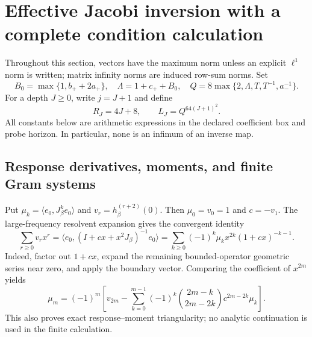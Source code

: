\section{Effective Jacobi inversion with a complete condition calculation}
\label{sec:quantitative-jacobi}
Throughout this section, vectors have the maximum norm unless an explicit
\(\ell^1\) norm is written; matrix infinity norms are induced row-sum norms.
Set
\[
 B_0=\max\{1,b_++2a_+\},\quad \Lambda=1+c_++B_0,\quad
 Q=8\max\{2,\Lambda,T,T^{-1},a_-^{-1}\}.
\]
For a depth \(J\ge0\), write \(j=J+1\) and define
\begin{equation}
 R_J=4J+8,\qquad L_J=Q^{64(J+1)^2}.
 \label{eq:effective-LJ}
\end{equation}
All constants below are arithmetic expressions in the declared coefficient
box and probe horizon. In particular, none is an infimum of an inverse map.

\subsection{Response derivatives, moments, and finite Gram systems}
Put \(\mu_k=\langle e_0,J_\beta^ke_0\rangle\) and
\(v_r=h_\beta^{(r+2)}(0)\). Then \(\mu_0=v_0=1\) and \(c=-v_1\).
The large-frequency resolvent expansion gives the convergent identity
\begin{equation}
 \sum_{r\ge0}v_rx^r
 =\langle e_0,(I+cx+x^2J_\beta)^{-1}e_0\rangle
 =\sum_{k\ge0}(-1)^k\mu_kx^{2k}(1+cx)^{-k-1}.
 \label{eq:response-moment-generating-identity}
\end{equation}
Indeed, factor out \(1+cx\), expand the remaining bounded-operator
geometric series near zero, and apply the boundary vector. Comparing the
coefficient of \(x^{2m}\) yields
\begin{equation}
 \mu_m=(-1)^m\left[v_{2m}-\sum_{k=0}^{m-1}(-1)^k
 \binom{2m-k}{2m-2k}c^{2m-2k}\mu_k\right].
 \label{eq:explicit-moment-recursion}
\end{equation}
This also proves exact response--moment triangularity; no analytic
continuation is used in the finite calculation.

